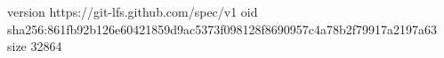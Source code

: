 version https://git-lfs.github.com/spec/v1
oid sha256:861fb92b126e60421859d9ac5373f098128f8690957c4a78b2f79917a2197a63
size 32864
